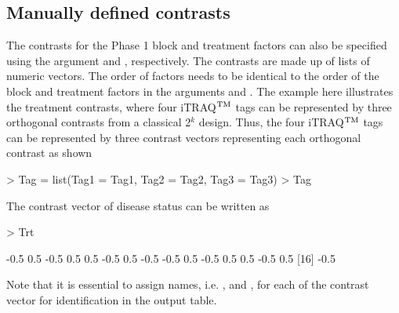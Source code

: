 \documentclass[article]{jss}
\begin{document}
\subsection{Manually defined contrasts}
The contrasts for the Phase 1 block and treatment factors can also be specified using the argument  and , respectively. The contrasts are made up of lists of numeric vectors. The order of factors needs to be identical to the order of the block and treatment factors in the arguments  and . The example here illustrates the treatment contrasts, where four iTRAQ$^{\rm TM}$ tags can be represented by three orthogonal contrasts from a classical 2$^k$ design. Thus, the four iTRAQ$^{\rm TM}$ tags can be represented by three contrast vectors representing each orthogonal contrast as shown 
\begin{CodeChunk}
\begin{CodeInput}
> Tag = list(Tag1 = Tag1, Tag2 = Tag2, Tag3 = Tag3)
> Tag
\end{CodeInput}
\end{CodeChunk}
 The contrast vector of disease status can be written as
\begin{CodeChunk}
\begin{CodeInput}
> Trt
\end{CodeInput}
\begin{CodeOutput}
 [1] -0.5  0.5 -0.5  0.5  0.5 -0.5  0.5 -0.5 -0.5  0.5 -0.5  0.5  0.5 -0.5  0.5
[16] -0.5
\end{CodeOutput}
\end{CodeChunk}
Note that it is essential to assign names, i.e. ,  and , for each of the contrast vector for identification in the output table.
\end{document}
